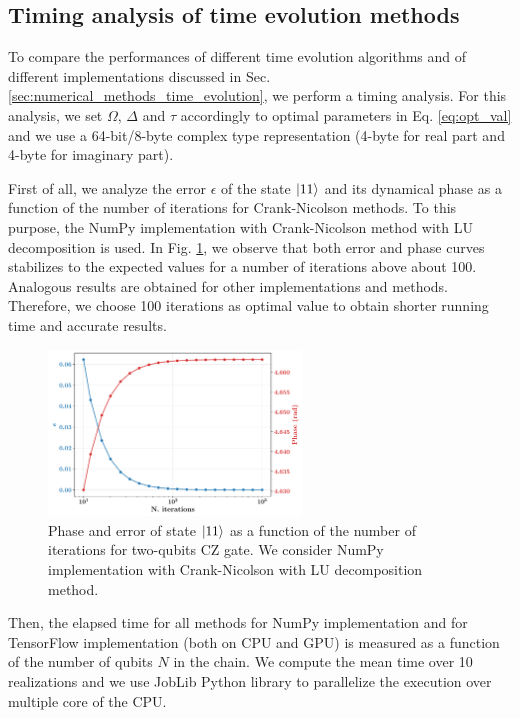 \documentclass[rmp,10pt,onecolumn,fleqn,notitlepage]{revtex4-1}
\begin{document}
\subsection{Timing analysis of time evolution methods}
 
To compare the performances of different time evolution algorithms and of different implementations discussed in Sec. \ref{sec:numerical_methods_time_evolution}, we perform a timing analysis. For this analysis, we set $\Omega$, $\Delta$ and $\tau$ accordingly to optimal parameters in Eq. \eqref{eq:opt_val} and we use a 64-bit/8-byte complex type representation (4-byte for real part and 4-byte for imaginary part).

First of all, we analyze the error $\epsilon$ of the state $\left\vert{11}\right\rangle$ and its dynamical phase as a function of the number of iterations for Crank-Nicolson methods. To this purpose, the NumPy implementation with Crank-Nicolson method with LU decomposition is used. In Fig. \ref{fig:fid_phase}, we observe that both error and phase curves stabilizes to the expected values for a number of iterations above about 100. Analogous results are obtained for other implementations and methods. Therefore, we choose 100 iterations as optimal value to obtain shorter running time and accurate results. 

\begin{figure}[H]
    \centering
    \includegraphics[width=0.6\textwidth]{image/timing/numpy_iter_fidelity_phase.pdf}
    \caption{Phase and error of state $\left\vert{11}\right\rangle$ as a function of the number of iterations for two-qubits CZ gate. We consider NumPy implementation with Crank-Nicolson with LU decomposition method.}
    \label{fig:fid_phase}
\end{figure}

Then, the elapsed time for all methods for NumPy implementation and for TensorFlow implementation (both on CPU and GPU) is measured as a function of the number of qubits $N$ in the chain. We compute the mean time over 10 realizations and we use JobLib Python library to parallelize the execution over multiple core of the CPU.
\end{document}
